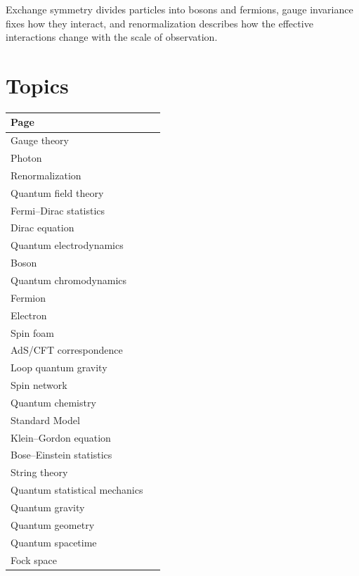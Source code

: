 \documentclass[11pt,oneside]{book}
\begin{document}
Exchange symmetry divides particles into bosons and fermions, gauge invariance fixes how they interact, and renormalization describes how the effective interactions change with the scale of observation.

\section*{Topics}

\begin{longtable}{p{0.92\linewidth}}
\toprule
Page \\
\midrule
\endhead
{}\label{page:gauge-theory}Gauge theory \\
\label{page:photon}Photon \\
\label{page:renormalization}Renormalization \\
\label{page:quantum-field-theory}Quantum field theory \\
\label{page:fermi-dirac-statistics}Fermi–Dirac statistics \\
\label{page:dirac-equation}Dirac equation \\
\label{page:quantum-electrodynamics}Quantum electrodynamics \\
\label{page:boson}Boson \\
\label{page:quantum-chromodynamics}Quantum chromodynamics \\
\label{page:fermion}Fermion \\
\label{page:electron}Electron \\
\label{page:spin-foam}Spin foam \\
\label{page:ads-cft-correspondence}AdS/CFT correspondence \\
\label{page:loop-quantum-gravity}Loop quantum gravity \\
\label{page:spin-network}Spin network \\
\label{page:quantum-chemistry}Quantum chemistry \\
\label{page:standard-model}Standard Model \\
\label{page:klein-gordon-equation}Klein–Gordon equation \\
\label{page:bose-einstein-statistics}Bose–Einstein statistics \\
\label{page:string-theory}String theory \\
\label{page:quantum-statistical-mechanics}Quantum statistical mechanics \\
\label{page:quantum-gravity}Quantum gravity \\
\label{page:quantum-geometry}Quantum geometry \\
\label{page:quantum-spacetime}Quantum spacetime \\
\label{page:fock-space}Fock space \\
\bottomrule
\end{longtable}
\end{document}
